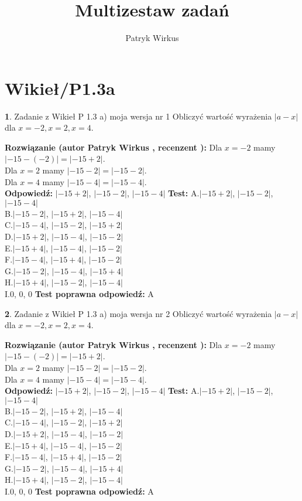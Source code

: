 \documentclass[12pt, a4paper]{article}
\title{Multizestaw zadań}
\author{Patryk Wirkus}
\date{}
\theoremstyle{definition} %
\newtheorem{zad}{}
\newcommand{\kategoria}[1]{\section{#1}}
\newcommand{\zadStart}[1]{\begin{zad}#1\newline}
\newcommand{\zadStop}{\end{zad}}
\newcommand{\rozwStart}[2]{\noindent \textbf{Rozwiązanie (autor #1 , recenzent #2): }\newline}
\newcommand{\rozwStop}{\newline}
\newcommand{\odpStart}{\noindent \textbf{Odpowiedź:}\newline}
\newcommand{\odpStop}{\newline}
\newcommand{\testStart}{\noindent \textbf{Test:}\newline}
\newcommand{\testStop}{\newline}
\newcommand{\kluczStart}{\noindent \textbf{Test poprawna odpowiedź:}\newline}
\newcommand{\kluczStop}{\newline}
\begin{document}
\maketitle

\kategoria{Wikieł/P1.3a}


\zadStart{Zadanie z Wikieł P 1.3 a) moja wersja nr 1}
Obliczyć wartość wyrażenia $|a - x|$ dla $x=-2,x=2,x=4$.
\zadStop
\rozwStart{Patryk Wirkus}{}
Dla $x = -2$ mamy $|-15 - (-2)| = |-15 + 2|$.\\
Dla $x = 2$ mamy $|-15 - 2| = |-15 - 2|$.\\
Dla $x = 4$ mamy $|-15 - 4| = |-15 - 4|$.\\
\rozwStop
\odpStart
$|-15 + 2|$, $|-15 - 2|$, $|-15 - 4|$
\odpStop
\testStart
A.$|-15 + 2|$, $|-15 - 2|$, $|-15 - 4|$\\
B.$|-15 - 2|$, $|-15 + 2|$, $|-15 - 4|$\\
C.$|-15 - 4|$, $|-15 - 2|$, $|-15 + 2|$\\
D.$|-15 + 2|$, $|-15 - 4|$, $|-15 - 2|$\\
E.$|-15 + 4|$, $|-15 - 4|$, $|-15 - 2|$\\
F.$|-15 - 4|$, $|-15 + 4|$, $|-15 - 2|$\\
G.$|-15 - 2|$, $|-15 - 4|$, $|-15 + 4|$\\
H.$|-15 + 4|$, $|-15 - 2|$, $|-15 - 4|$\\
I.$0$, $0$, $0$
\testStop
\kluczStart
A
\kluczStop



\zadStart{Zadanie z Wikieł P 1.3 a) moja wersja nr 2}
Obliczyć wartość wyrażenia $|a - x|$ dla $x=-2,x=2,x=4$.
\zadStop
\rozwStart{Patryk Wirkus}{}
Dla $x = -2$ mamy $|-15 - (-2)| = |-15 + 2|$.\\
Dla $x = 2$ mamy $|-15 - 2| = |-15 - 2|$.\\
Dla $x = 4$ mamy $|-15 - 4| = |-15 - 4|$.\\
\rozwStop
\odpStart
$|-15 + 2|$, $|-15 - 2|$, $|-15 - 4|$
\odpStop
\testStart
A.$|-15 + 2|$, $|-15 - 2|$, $|-15 - 4|$\\
B.$|-15 - 2|$, $|-15 + 2|$, $|-15 - 4|$\\
C.$|-15 - 4|$, $|-15 - 2|$, $|-15 + 2|$\\
D.$|-15 + 2|$, $|-15 - 4|$, $|-15 - 2|$\\
E.$|-15 + 4|$, $|-15 - 4|$, $|-15 - 2|$\\
F.$|-15 - 4|$, $|-15 + 4|$, $|-15 - 2|$\\
G.$|-15 - 2|$, $|-15 - 4|$, $|-15 + 4|$\\
H.$|-15 + 4|$, $|-15 - 2|$, $|-15 - 4|$\\
I.$0$, $0$, $0$
\testStop
\kluczStart
A
\kluczStop
\end{document}
